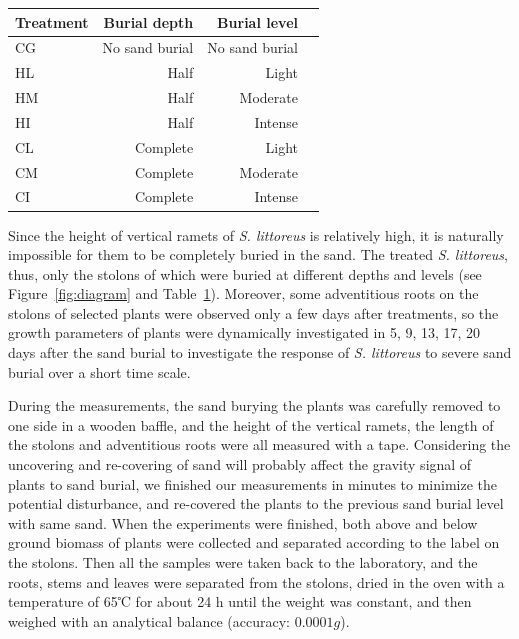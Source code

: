 \documentclass[]{interact}
\theoremstyle{plain}%
\theoremstyle{definition}
\theoremstyle{remark}
\begin{document}
\begin{table}
  {\begin{tabular}{lrrr} 
  \toprule
   Treatment & Burial depth & Burial level \\ 
  \midrule
   CG & No sand burial & No sand burial \\
   HL & Half & Light \\
   HM & Half & Moderate \\
   HI & Half & Intense \\
   CL & Complete & Light \\
   CM & Complete & Moderate \\
   CI & Complete & Intense \\
  \bottomrule
  \end{tabular}}
  \label{tab:treatment}
\end{table}

Since the height of vertical ramets of \textit{S. littoreus} is relatively high, it is naturally impossible for them to be completely buried in the sand. The treated \textit{S. littoreus}, thus, only the stolons of which were buried at different depths and levels (see Figure~\ref{fig:diagram} and Table~\ref{tab:treatment}). Moreover, some adventitious roots on the stolons of selected plants were observed only a few days after treatments, so the growth parameters of plants were dynamically investigated in 5, 9, 13, 17, 20 days after the sand burial to investigate the response of \textit{S. littoreus} to severe sand burial over a short time scale.

During the measurements, the sand burying the plants was carefully removed to one side in a wooden baffle, and the height of the vertical ramets, the length of the stolons and adventitious roots were all measured with a tape. Considering the uncovering and re-covering of sand will probably affect the gravity signal of plants to sand burial, we finished our measurements in minutes to minimize the potential disturbance, and re-covered the plants to the previous sand burial level with same sand. When the experiments were finished, both above and below ground biomass of plants were collected and separated according to the label on the stolons. Then all the samples were taken back to the laboratory, and the roots, stems and leaves were separated from the stolons, dried in the oven with a temperature of 65℃ for about 24 h until the weight was constant, and then weighed with an analytical balance (accuracy: $0.0001g$).
\end{document}
